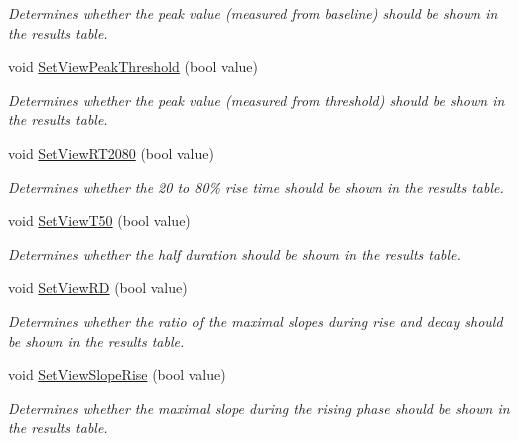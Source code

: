 \begin{DoxyCompactItemize}
\begin{DoxyCompactList}\small\item\em Determines whether the peak value (measured from baseline) should be shown in the results table. \item\end{DoxyCompactList}\item 
void \hyperlink{classRecording_a50309299cc689fbfe215f3ecf42bb1b8}{SetViewPeakThreshold} (bool value)
\begin{DoxyCompactList}\small\item\em Determines whether the peak value (measured from threshold) should be shown in the results table. \item\end{DoxyCompactList}\item 
void \hyperlink{classRecording_a148b9f6634f6696cec152dee80b07b4e}{SetViewRT2080} (bool value)
\begin{DoxyCompactList}\small\item\em Determines whether the 20 to 80\% rise time should be shown in the results table. \item\end{DoxyCompactList}\item 
void \hyperlink{classRecording_a9b00580a170cf02308fec3405b0ed986}{SetViewT50} (bool value)
\begin{DoxyCompactList}\small\item\em Determines whether the half duration should be shown in the results table. \item\end{DoxyCompactList}\item 
void \hyperlink{classRecording_a7e1c637e21819fde5418f3abab0ee7d4}{SetViewRD} (bool value)
\begin{DoxyCompactList}\small\item\em Determines whether the ratio of the maximal slopes during rise and decay should be shown in the results table. \item\end{DoxyCompactList}\item 
void \hyperlink{classRecording_ad30944aefb82fd245d3890f1f9ed21fa}{SetViewSlopeRise} (bool value)
\begin{DoxyCompactList}\small\item\em Determines whether the maximal slope during the rising phase should be shown in the results table. \item\end{DoxyCompactList}\item 

\end{DoxyCompactItemize}

